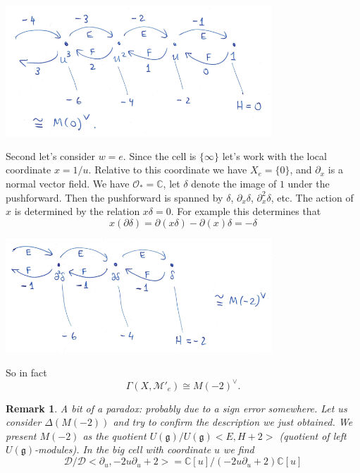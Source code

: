 \documentclass[12pt]{article}
\theoremstyle{plain}
\newtheorem{rem}[thm]{Remark}
\theoremstyle{definition}
\numberwithin{equation}{section}
\newcommand{\M}{\mathcal{M}}
\newcommand{\C}{\mathbb{C}}
\newcommand{\g}{\mathfrak{g}}
\newcommand{\CD}{\mathcal{D}}
\newcommand{\OO}{\mathcal{O}}
\begin{document}
\begin{center}
\includegraphics[width=100mm]{D-mod-big-cell.png}
\end{center}

Second let's consider $w = e$. Since the cell is $\{\infty\}$ let's work with the local coordinate $x = 1/u$. Relative to this coordinate we have $X_e = \{0\}$, and $\partial_x$ is a normal vector field. We have $\OO_{*} = \C$, let $\delta$ denote the image of $1$ under the pushforward. Then the pushforward is spanned by $\delta$, $\partial_x \delta$, $\partial_x^2 \delta$, etc. The action of $x$ is determined by the relation $x \delta = 0$. For example this determines that
\[
x(\partial \delta) = \partial(x \delta) - \partial(x) \delta = -\delta
\]




\begin{center}
\includegraphics[width=100mm]{D-mod-little-cell.png}
\end{center}

So in fact
\[
\Gamma(X, \M'_e) \cong M(-2)^\vee.
\]

{\color{blue}
\begin{rem}
A bit of a paradox: probably due to a sign error somewhere. Let us consider $\Delta(M(-2))$ and try to confirm the description we just obtained. We present $M(-2)$ as the quotient $U(\g) / U(\g) <E, H+2>$ (quotient of left $U(\g)$-modules). In the big cell with coordinate $u$ we find
\[
\CD / \CD <\partial_u, -2u \partial_u + 2> = \C[u] / (-2u \partial_u + 2)\C[u]
\]

\end{rem}
}
\end{document}
